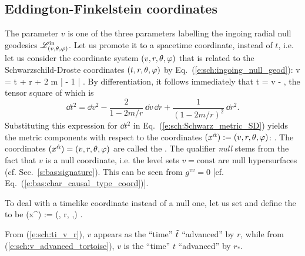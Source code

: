 \subsection{Eddington-Finkelstein coordinates} \label{s:sch:EF_coord}

The parameter $v$ is one of the three parameters labelling the
ingoing radial null geodesics $\mathscr{L}^{\rm in}_{(v,\theta,\varphi)}$.
Let us promote it to a spacetime coordinate, instead of $t$, i.e. let us
consider the coordinate system $(v,r,\theta,\varphi)$ that is related to the
Schwarzschild-Droste coordinates $(t,r,\theta,\varphi)$ by Eq.~(\ref{e:sch:ingoing_null_geod}):
\be \label{e:sch:v_t_r}
     v = t + r + 2 m \ln \left|  - 1 \right| .
\ee
By differentiation, it follows immediately that
\be \label{e:sch:dt_dv_NIEF}
    \dd t = \dd v -   ,
\ee
the tensor square of which is
\[
    \dd t^2 = \dd v^2 - \frac{2}{1 - 2m/r} \, \dd v \, \dd r + \frac{1}{(1 - 2m/r)^2}\, \dd r^2 .
\]
Substituting this expression for $\dd t^2$ in Eq.~(\ref{e:sch:Schwarz_metric_SD})
yields the metric components with respect to the coordinates
$(x^{\hat{\alpha}}) := (v,r,\theta,\varphi)$:
\be \label{e:sch:Schwarz_metric_NIEF}
    .
\ee
The coordinates $(x^{\hat{\alpha}}) = (v,r,\theta,\varphi)$ are called the
. The qualifier \emph{null} stems from the fact that
$v$ is a null coordinate, i.e. the level sets $v = \mathrm{const}$ are null hypersurfaces
(cf. Sec.~\ref{s:bas:signature}). This can be seen from $g^{vv} = 0$ [cf. Eq.~(\ref{e:bas:char_causal_type_coord})].

To deal with a timelike coordinate instead of a null one, let us set
\be  \label{e:sch:ti_v_r}
     \iff {}
\ee
and define the 
to be
\be
    (x^{\tilde{\alpha}}) := (\ti, r, \th,\ph) .
\ee

\begin{remark}
From (\ref{e:sch:ti_v_r}), $v$ appears as the ``time'' ${\tilde t}$ ``advanced'' by
$r$, while
from (\ref{e:sch:v_advanced_tortoise}), $v$ is the ``time'' $t$ ``advanced''
by $r_*$.
\end{remark}


